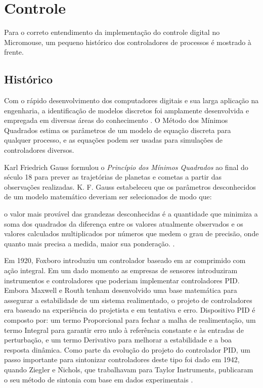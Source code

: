 \section{Controle}
Para o correto entendimento da implementação do controle digital no Micromouse, um pequeno histórico dos controladores de processos é mostrado à frente.


\subsection{Histórico}

Com o rápido desenvolvimento dos computadores digitais e sua larga aplicação na engenharia, a identificação de modelos discretos foi amplamente desenvolvida e empregada em diversas áreas do conhecimento \cite{demodelo}. O Método dos Mínimos Quadrados estima os parâmetros de um modelo de equação discreta para qualquer processo, e as equações podem ser usadas para simulações de controladores diversos.

Karl Friedrich Gauss formulou o \emph{Princípio dos Mínimos Quadrados} ao final do século 18 para prever as trajetórias de planetas e cometas a partir das observações realizadas. K. F. Gauss estabeleceu que os parâmetros desconhecidos de um modelo matemático deveriam ser selecionados de modo que:

\begin{citacao}
o valor mais provável das grandezas desconhecidas é a quantidade que minimiza a soma dos quadrados da diferença entre os valores atualmente observados e os valores calculados multiplicados por números que medem o grau de precisão, onde quanto mais precisa a medida, maior sua ponderação. .
\end{citacao}


Em 1920, Foxboro introduziu um controlador baseado em ar comprimido com ação integral. Em um dado momento as empresas de sensores introduziram instrumentos e controladores que poderiam implementar controladores PID. Embora Maxwell e Routh tenham desenvolvido uma base matemática para assegurar a estabilidade de um sistema realimentado, o projeto de controladores era baseado na experiência do projetista e em tentativa e erro. Dispositivo PID é composto por: um termo Proporcional para fechar a malha de realimentação, um termo Integral para garantir erro nulo à referência constante e às entradas de perturbação, e um termo Derivativo para melhorar a estabilidade e a boa resposta dinâmica. Como parte da evolução do projeto do controlador PID, um passo importante para sintonizar controladores deste tipo foi dado em 1942, quando Ziegler e Nichols, que trabalhavam para Taylor Instruments, publicaram o seu método de sintonia com base em dados experimentais \cite{FRANKLIN:2013}.

